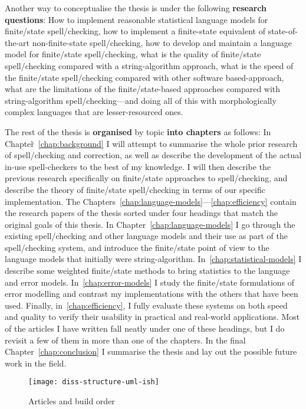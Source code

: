 \documentclass[officiallayout]{unihelcompling}
\begin{document}
Another way to conceptualise the thesis is under the following \textbf{research
questions}: How to implement reasonable statistical language models for
finite\-/state spell\-/checking, how to implement a finite-state equivalent of
state-of-the-art non-finite-state spell\-/checking, how to develop and maintain a
language model for finite\-/state spell\-/checking, what is the quality of
finite\-/state spell\-/checking compared with a string-algorithm approach, what is the
speed of the finite\-/state spell\-/checking compared with other software
based-approach, what are the limitations of the finite\-/state-based approaches
compared with string-algorithm spell\-/checking---and doing all of this with
morphologically complex languages that are lesser-resourced ones.

The rest of the thesis is \textbf{organised} by topic \textbf{into chapters} as
follows: In Chapter̃~\ref{chap:background} I will attempt to summarise the whole prior
research of spell\-/checking and correction, as well as describe the
development of the actual in-use spell-checkers to the best of my knowledge. I
will then describe the previous research specifically on finite\-/state
approaches to spell\-/checking, and describe the theory of finite\-/state
spell\-/checking in terms of our specific implementation. The
Chapters~\ref{chap:language-models}---\ref{chap:efficiency} contain the
research papers of the thesis sorted under four headings that match the original
goals of this thesis.  In Chapter~\ref{chap:language-models} I go through the
existing spell\-/checking and other language models and their use as part of
the spell\-/checking system, and introduce the finite\-/state point of view to
the language models that initially were string-algorithm.
In~\ref{chap:statistical-models} I describe some weighted finite\-/state methods
to bring statistics to the language and error models.
In~\ref{chap:error-models} I study the finite\-/state formulations of error
modelling and contrast my implementations with the others that have been used.
Finally, in~\ref{chap:efficiency}, I fully evaluate these systems on both speed
and quality to verify their usability in practical and real-world applications.
Most of the articles I have written fall neatly under one of these headings,
but I do revisit a few of them in more than one of the chapters. In the final
Chapter~\ref{chap:conclusion} I summarise the thesis and lay out the possible
future work in the field.

\begin{figure}
    \texttt{[image: diss-structure-uml-ish]}
    \caption{Articles and build order
    \label{fig:schematic-diagram}}
\end{figure}
\end{document}

